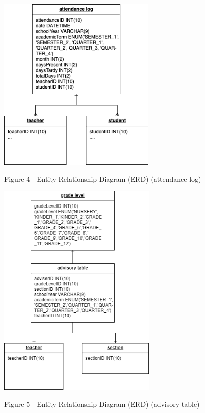 \documentclass[11pt,a4paper,titlepage]{article}
\begin{document}
\vspace{1cm}
\begin{center}
    \includegraphics[height=8.5cm]{Attendance-Log.png}
\end{center}
\vspace{1cm}
\begin{center}
    Figure 4 - Entity Relationship Diagram (ERD) (attendance log)
\end{center}

\vspace{1cm}
\begin{center}
    \includegraphics[height=10.5cm]{Advisory-Table.png}
\end{center}
\vspace{1cm}
\begin{center}
    Figure 5 - Entity Relationship Diagram (ERD) (advisory table)
\end{center}
\end{document}
